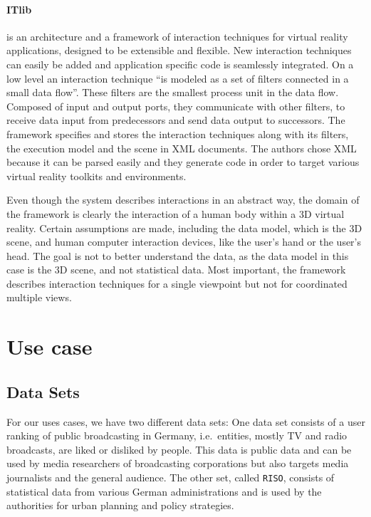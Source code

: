 \documentclass{article}
\newcommand{\riso}{\texttt{RISO}}
\begin{document}
\paragraph{ITlib\cite{Figueroa2001}} is an architecture and a framework of interaction techniques for virtual reality applications, designed to be extensible and flexible.
New interaction techniques can easily be added and application specific code is seamlessly integrated.
On a low level an interaction technique ``is modeled as a set of filters connected in a small data flow''\cite[Basic concept, p.~2]{Figueroa2001}.
These filters are the smallest process unit in the data flow.
Composed of input and output ports, they communicate with other filters, to receive data input from predecessors and send data output to successors.
The framework specifies and stores the interaction techniques along with its filters, the execution model and the scene in XML documents.
The authors chose XML because it can be parsed easily and they generate code in order to target various virtual reality toolkits and environments.

Even though the system describes interactions in an abstract way, the domain of the framework is clearly the interaction of a human body within a 3D virtual reality.
Certain assumptions are made, including the data model, which is the 3D scene, and human computer interaction devices, like the user's hand or the user's head.
The goal is not to better understand the data, as the data model in this case is the 3D scene, and not statistical data.
Most important, the framework describes interaction techniques for a single viewpoint but not for coordinated multiple views.

\clearpage
\section{Use case}\label{sec:use-case}

\subsection{Data Sets}
For our uses cases, we have two different data sets:
One data set consists of a user ranking of public broadcasting in Germany, i.e.\ entities, mostly TV and radio broadcasts, are liked or disliked by people.
This data is public data and can be used by media researchers of broadcasting corporations but also targets media journalists and the general audience.
The other set, called \riso{}, consists of statistical data from various German administrations and is used by the authorities for urban planning and policy strategies.
\end{document}
